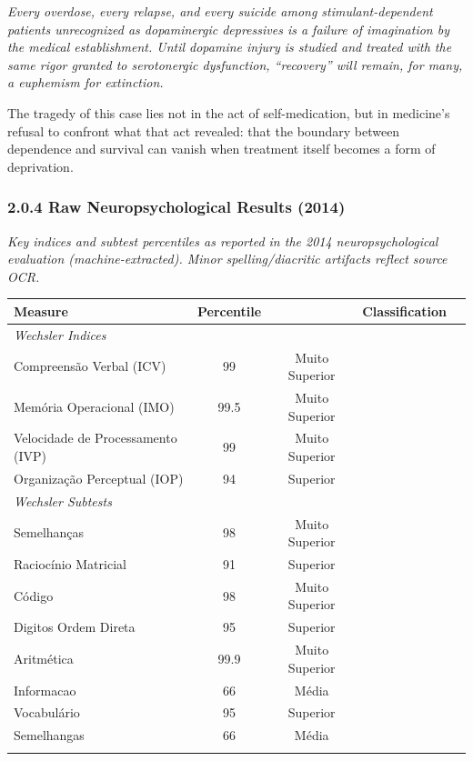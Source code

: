 \emph{Every overdose, every relapse, and every suicide among stimulant-dependent patients unrecognized as dopaminergic depressives is a failure of imagination by the medical establishment. Until dopamine injury is studied and treated with the same rigor granted to serotonergic dysfunction, ``recovery'' will remain, for many, a euphemism for extinction.}

The tragedy of this case lies not in the act of self-medication, but in medicine's refusal to confront what that act revealed: that the boundary between dependence and survival can vanish when treatment itself becomes a form of deprivation.

\subsubsection{2.0.4 Raw Neuropsychological Results (2014)}\label{10b_traad-raw-neuropsychological-results-2014}

\emph{Key indices and subtest percentiles as reported in the 2014 neuropsychological evaluation (machine-extracted). Minor spelling/diacritic artifacts reflect source OCR.}

{\def\LTcaptype{none} %
\begin{longtable}[]{@{}lcccl@{}}
\toprule\noalign{}
Measure & Percentile & & Classification & \\
\midrule\noalign{}
\endhead
\bottomrule\noalign{}
\endlastfoot
\emph{Wechsler Indices} & & & & \\
Compreensão Verbal (ICV) & 99 & Muito Superior & & \\
Memória Operacional (IMO) & 99.5 & Muito Superior & & \\
Velocidade de Processamento (IVP) & 99 & Muito Superior & & \\
Organização Perceptual (IOP) & 94 & Superior & & \\
\emph{Wechsler Subtests} & & & & \\
Semelhanças & 98 & Muito Superior & & \\
Raciocínio Matricial & 91 & Superior & & \\
Código & 98 & Muito Superior & & \\
Digitos Ordem Direta & 95 & Superior & & \\
Aritmética & 99.9 & Muito Superior & & \\
Informacao & 66 & Média & & \\
Vocabulário & 95 & Superior & & \\
Semelhangas & 66 & Média & & \\
& & & & \\
\end{longtable}
}

